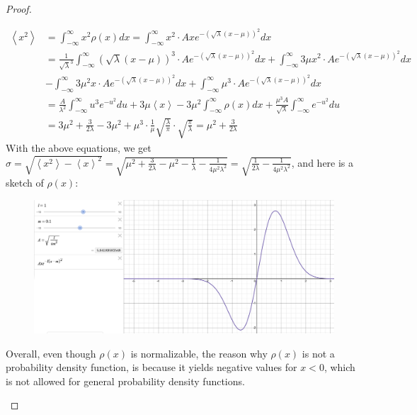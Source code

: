 \documentclass{article}
\begin{document}
\begin{proof}
\begin{itemize}
        \hfil

        \begin{align}
            \left<x^2\right>&=\int_{-\infty}^{\infty}x^2\rho(x)dx = \int_{-\infty}^{\infty}x^2 \cdot Axe^{-(\sqrt{\lambda}(x-\mu))^2}dx\\
            &= \frac{1}{\sqrt{\lambda}^3}\int_{-\infty}^{\infty}(\sqrt{\lambda}(x-\mu))^3\cdot Ae^{-(\sqrt{\lambda}(x-\mu))^2}dx+\int_{-\infty}^{\infty}3\mu x^2\cdot Ae^{-(\sqrt{\lambda}(x-\mu))^2}dx\\ &- \int_{-\infty}^{\infty}3\mu^2 x\cdot Ae^{-(\sqrt{\lambda}(x-\mu))^2}dx +\int_{-\infty}^{\infty}\mu^3\cdot Ae^{-(\sqrt{\lambda}(x-\mu))^2}dx\\
            &=\frac{A}{\lambda^2}\int_{-\infty}^{\infty}u^3e^{-u^2}du + 3\mu\left<x\right> - 3\mu^2\int_{-\infty}^{\infty}\rho(x)dx + \frac{\mu^3A}{\sqrt{\lambda}}\int_{-\infty}^{\infty}e^{-u^2}du\\
            &= 3\mu^2+\frac{3}{2\lambda} - 3\mu^2 + \mu^3\cdot \frac{1}{\mu}\sqrt{\frac{\lambda}{\pi}}\cdot\sqrt{\frac{\pi}{\lambda}}=\mu^2+\frac{3}{2\lambda}
        \end{align}
        With the above equations, we get $\sigma=\sqrt{\left<x^2\right>-\left<x\right>^2} = \sqrt{\mu^2+\frac{3}{2\lambda}-\mu^2-\frac{1}{\lambda}-\frac{1}{4\mu^2\lambda^2}} = \sqrt{\frac{1}{2\lambda}-\frac{1}{4\mu^2\lambda^2}}$, and here is a sketch of $\rho(x)$:

        \begin{figure}[h!]
            \centering
            \includegraphics[width=150mm]{q2_b.png}
        \end{figure}

        Overall, even though $\rho(x)$ is normalizable, the reason why $\rho(x)$ is not a probability density function, is because it yields negative values for $x<0$, which is not allowed for general probability density functions.

        \hfil


\end{itemize}
\end{proof}
\end{document}
